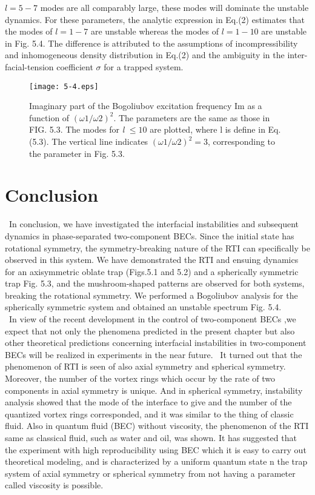 \documentclass[12pt,a4paper]{jbook}
\begin{document}
$l=5-7$ modes are all comparably large, these modes will
dominate the unstable dynamics. For these parameters, the
analytic expression in Eq.(2) estimates that the modes of $l=1-7$
are unstable whereas the modes of $l=1-10$ are unstable
in Fig. 5.4. The difference is attributed to the assumptions of
incompressibility and inhomogeneous density distribution in
Eq.(2) and the ambiguity in the inter-facial-tension coefficient
$\sigma$ for a trapped system.
\begin{figure}[htbp]
\begin{center}
\texttt{[image: 5-4.eps]}
\caption{
Imaginary part of the Bogoliubov excitation
frequency Im as a function of $( \omega 1 / \omega 2 )^2$. The parameters
are the same as those in FIG. 5.3. The modes for {\it l} $\le 10$ are plotted,
where l is define in Eq. (5.3). The vertical line indicates $( \omega 1 / \omega 2 )^2 = 3$,
corresponding to the parameter in Fig. 5.3.
}
\label{FIG:5-4}
\end{center}
\end{figure}

\section{Conclusion}
\ In conclusion, we have investigated the interfacial instabilities
and subsequent dynamics in phase-separated two-component
BECs. Since the initial state has rotational symmetry,
the symmetry-breaking nature of the RTI can specifically
be observed in this system. We have demonstrated the RTI and
ensuing dynamics for an axisymmetric oblate trap (Figs.5.1 and 5.2)
and a spherically symmetric trap Fig. 5.3, and the
mushroom-shaped patterns are observed for both systems,
breaking the rotational symmetry. We performed a Bogoliubov
analysis for the spherically symmetric system and obtained an
unstable spectrum Fig. 5.4.
\\
\ In view of the recent development in the control of
two-component BECs \cite{72}\cite{75}\cite{76},we expect that not only the
phenomena predicted in the present chapter but also other
theoretical predictions \cite{62}\cite{63}\cite{64}\cite{65}\cite{77}\cite{78}\cite{79}\cite{80}
concerning interfacial instabilities in
two-component BECs will be realized in experiments in the near future.
\ It turned out that the phenomenon of RTI is seen
of also axial symmetry and spherical symmetry.
Moreover, the number of the vortex rings
which occur by the rate of two components
in axial symmetry is unique.
And in spherical symmetry,
instability analysis showed
that the mode of the interface
to give and the number of the quantized vortex rings corresponded,
and it was similar to the thing of classic fluid.
Also in quantum fluid (BEC) without viscosity,
the phenomenon of the RTI same as classical fluid,
such as water and oil, was shown.
It has suggested that the experiment
with high reproducibility using BEC
which it is easy to carry out theoretical modeling,
and is characterized by a uniform quantum state
n the trap system of axial symmetry
or spherical symmetry from not having a parameter
called viscosity is possible.
\fi
\end{document}
